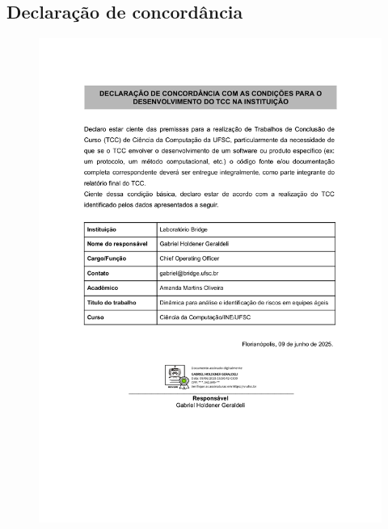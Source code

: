 \documentclass[
	12pt,
	openright,
	twoside,
	a4paper,
	english,
	brazil
	]{abntex2}
\begin{document}
\begin{anexos}

\chapter{Declaração de concordância}
\label{anexo:declaracao-concordancia}

\begin{figure}[H]
  \centering
  \includegraphics[width=1\textwidth]{print_assinatura}
\end{figure}

%

\end{anexos}


\printindex

\end{document}
